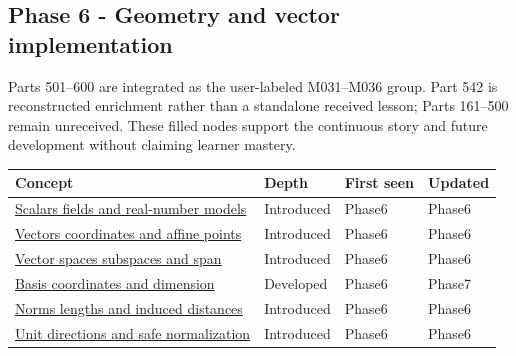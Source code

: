 \subsection{Phase 6 - Geometry and vector implementation}\label{appendix-a6d556a4ef50-phase-6---geometry-and-vector-implementation}

Parts 501--600 are integrated as the user-labeled M031--M036 group. Part 542 is reconstructed enrichment rather than a standalone received lesson; Parts 161--500 remain unreceived. These filled nodes support the continuous story and future development without claiming learner mastery.

{\def\LTcaptype{none} %
\begin{longtable}[]{@{}
  >{\raggedright\arraybackslash}p{}
  >{\raggedright\arraybackslash}p{}
  >{\raggedright\arraybackslash}p{}
  >{\raggedright\arraybackslash}p{}@{}}
\toprule\noalign{}
\begin{minipage}[b]{\linewidth}\raggedright
Concept
\end{minipage} & \begin{minipage}[b]{\linewidth}\raggedright
Depth
\end{minipage} & \begin{minipage}[b]{\linewidth}\raggedright
First seen
\end{minipage} & \begin{minipage}[b]{\linewidth}\raggedright
Updated
\end{minipage} \\
\midrule\noalign{}
\endhead
\bottomrule\noalign{}
\endlastfoot
\hyperref[appendix-52051ad550fe]{Scalars fields and real-number models} & Introduced & Phase6 & Phase6 \\
\hyperref[appendix-0659864c0aa3]{Vectors coordinates and affine points} & Introduced & Phase6 & Phase6 \\
\hyperref[appendix-173b52c063ae]{Vector spaces subspaces and span} & Introduced & Phase6 & Phase6 \\
\hyperref[appendix-ce0341f7ea0d]{Basis coordinates and dimension} & Developed & Phase6 & Phase7 \\
\hyperref[appendix-49933872bb51]{Norms lengths and induced distances} & Introduced & Phase6 & Phase6 \\
\hyperref[appendix-f744e41b95b4]{Unit directions and safe normalization} & Introduced & Phase6 & Phase6 \\

\end{longtable}}
